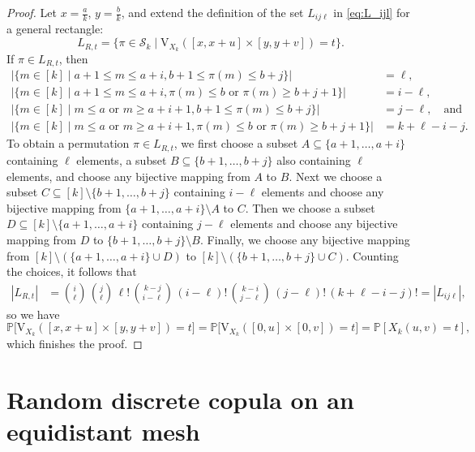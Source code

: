 \documentclass[12pt,a4paper]{amsart}
\theoremstyle{definition}
\newcommand{\SK}{\mathcal{S}_k}
\newcommand{\PP}{\mathbb{P}}
\newcommand{\vol}{\mathrm{V}}
\begin{document}
\begin{proof}
Let $x=\tfrac{a}{k}$, $y=\tfrac{b}{k}$, and extend the definition of the set $L_{ij\ell}$ in \eqref{eq:L_ijl} for a general rectangle:
\begin{equation*}
     L_{R,t} = \{\pi \in \SK \mid \vol_{X_k}([x,x+u]\times[y,y+v])= t\}.
\end{equation*}
If $\pi \in L_{R,t}$, then
\begin{align*}
|\{m \in [k] \mid a+1 \le m \le a+i, b +1 \le \pi(m) \le b+j \}| &= \ell, \\
|\{m \in [k] \mid a+1 \le m \le a+i, \pi(m) \le b \,\, \text{or} \,\, \pi(m) \ge b+j+1 \}| &= i-\ell, \\
|\{m \in [k] \mid m \le a \,\, \text{or} \,\, m \ge a+i+1,  b+1 \le \pi(m) \le b+j \}| &= j-\ell, \quad\text{and} \\
|\{m \in [k] \mid m \le a \,\, \text{or} \,\, m \ge a+i+1, \pi(m) \le b \,\, \text{or} \,\, \pi(m) \ge b+j+1\}| &= k+\ell-i-j. 
\end{align*}
To obtain a permutation $\pi \in L_{R,t}$, we first choose a subset $A \subseteq \{a+1,\ldots,a+i\}$ containing $\ell$ elements, a subset $B \subseteq \{b+1,\ldots,b+j\}$ also containing $\ell$ elements, and choose any bijective mapping from $A$ to $B$. Next we choose a subset $C \subseteq [k]\setminus \{b+1,\ldots,b+j\}$ containing $i-\ell$ elements and choose any bijective mapping from $\{a+1,\ldots,a+i\}\setminus A$ to $C$. Then we choose a subset $D \subseteq [k]\setminus \{a+1,\ldots,a+i\}$ containing $j-\ell$ elements and choose any bijective mapping from $D$ to $\{b+1,\ldots,b+j\}\setminus B$. Finally, we choose any bijective mapping from $[k]\setminus(\{a+1,\ldots,a+i\}\cup D)$ to $[k]\setminus(\{b+1,\ldots,b+j\}\cup C)$.
Counting the choices, it follows that
\begin{align*}
    |L_{R,t}|
    &= \binom{i}{\ell} \, \binom{j}{\ell} \, \ell! \, \binom{k-j}{i-\ell} \, (i-\ell)! \, \binom{k-i}{j-\ell} \, (j-\ell)! \,(k+\ell-i-j)!=|L_{ij\ell}|,
\end{align*}
so we have
$$\PP\big[\vol_{X_k}([x,x+u]\times[y,y+v])=t\big] = \PP\big[\vol_{X_k}([0,u]\times[0,v])=t\big]=\PP[X_k(u,v)=t],$$
which finishes the proof.
\end{proof}


\section{Random discrete copula on an equidistant mesh} \label{se:general}
\end{document}
